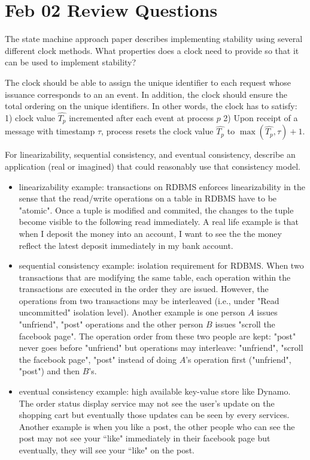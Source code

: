 \section{Feb 02 Review Questions}
\begin{QandA}
   \item The state machine approach paper describes implementing stability using several different clock methods. What properties does a clock need to provide so that it can be used to implement stability?
         \begin{answered}
 		 The clock should be able to assign the unique identifier to each request whose issuance corresponds to an an event. In addition, the clock should ensure the total ordering on the unique identifiers. In other words, the clock has to satisfy: 1) clock value $\hat{T_p}$ incremented after each event at process $p$ 2) Upon receipt of a message with timestamp $\tau$, process resets the clock value $\hat{T_p}$ to 
 		 $\max(\hat{T_p}, \tau) + 1$.
         \end{answered}

   \item For linearizability, sequential consistency, and eventual consistency, describe an application (real or imagined) that could reasonably use that consistency model.
         \begin{answered}
		 \begin{itemize}
		 \item linearizability example: transactions on RDBMS enforces linearizability in the sense that the read/write operations on a table in RDBMS have to be "atomic". Once a tuple is modified and commited,
		 the changes to the tuple become visible to the following read immediately. A real life example is that when I deposit the money into an 
		 account, I want to see the the money reflect the latest deposit immediately in my bank account.
		 \item sequential consistency example: isolation requirement for RDBMS. When two transactions that are modifying the same table, each operation
		 within the transactions are executed in the order they are issued. However, the operations from two transactions may be interleaved (i.e., under "Read uncommitted" isolation level). Another
		 example is one person $A$ issues "unfriend", "post" operations and the other person $B$ issues "scroll the facebook page". The operation
		 order from these two people are kept: "post" never goes before "unfriend" but operations may interleave: "unfriend", "scroll the facebook
		 page", "post" instead of doing $A$'s operation first ("unfriend", "post") and then $B$'s.
		 \item eventual consistency example: high available key-value store like Dynamo. The order status display service may not see the user's
		 update on the shopping cart but eventually those updates can be seen by every services. Another example is when you like a post, the 
		 other people who can see the post may not see your ``like" immediately in their facebook page but eventually, they will see your ``like" on the post.
		 \end{itemize}
         \end{answered}
         

\end{QandA}
